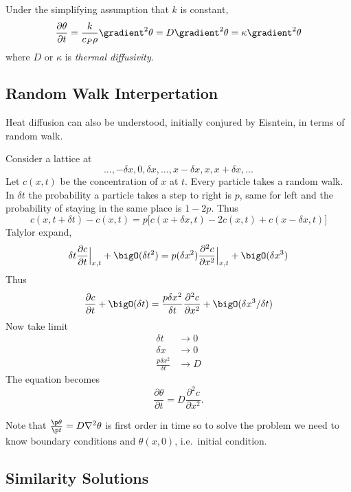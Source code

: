 \documentclass[a4paper]{article}
\newcommand*\grad{\gradient}
\begin{document}
Under the simplifying assumption that \(k\) is constant,
\[
  \frac{\partial \theta}{\partial t} = \frac{k}{c_P\rho} \grad^2 \theta = D \grad^2 \theta = \kappa \grad^2 \theta
\]
where \(D\) or \(\kappa\) is \emph{thermal diffusivity}.

\subsection{Random Walk Interpertation}

Heat diffusion can also be understood, initially conjured by Eisntein, in terms of random walk.

Consider a lattice at
\[
  \dots, -\delta x, 0, \delta x, \dots, x- \delta x, x, x+ \delta x, \dots
\]
Let \(c(x,t)\) be the concentration of \(x\) at \(t\). Every particle takes a random walk. In \(\delta t\) the probability a particle takes a step to right is \(p\), same for left and the probability of staying in the same place is \(1-2p\). Thus
\[
  c(x, t + \delta t) - c(x, t) = p \Big[ c(x + \delta x, t) -2 c(x, t) + c(x - \delta x, t) \Big]
\]
Talylor expand,
\[
  \delta t \frac{\partial c}{\partial t} \Big|_{x,t} + \bigO(\delta t^2) = p(\delta x^2) \frac{\partial^2 c}{\partial x^2} \Big|_{x,t} + \bigO(\delta x^3)
\]
Thus
\[
  \frac{\partial c}{\partial t} + \bigO(\delta t) = \frac{p \delta x^2}{\delta t} \frac{\partial^2 c}{\partial x^2} + \bigO(\delta x^3/\delta t)
\]
Now take limit
\begin{align*}
  \delta t &\to 0 \\
  \delta x &\to 0 \\
  \frac{p\delta x^2}{\delta t} &\to D
\end{align*}
The equation becomes
\[
  \frac{\partial \theta}{\partial t} = D \frac{\partial^2 c}{\partial x^2}.
\]

Note that \(\frac{\p \theta}{\p t} = D \nabla^2\theta\) is first order in time so to solve the problem we need to know boundary conditions and \(\theta(x,0)\), i.e.\ initial condition.

\subsection{Similarity Solutions}
\end{document}
